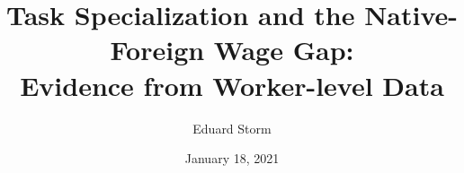 \documentclass[10pt]{beamer}
\title[Task Specialization \& NF Wage Gap]{Task Specialization and the Native-Foreign Wage Gap: \\ Evidence from Worker-level Data} %
\author{Eduard Storm} %
\institute[estorm@carleton.edu]
{
	
	
	\medskip 
	
	Department of Economics \\  
	Carleton College \\ %
	
	\bigskip
	
	 Job Market Paper Presentation for: \\
		\smallskip
	\textit{Ca' Foscari University of Venice}
}
\date{January 18, 2021} %
\begin{document}
\begin{frame}
\titlepage %
\end{frame}






 
 
 
 
 
 

\end{document}
